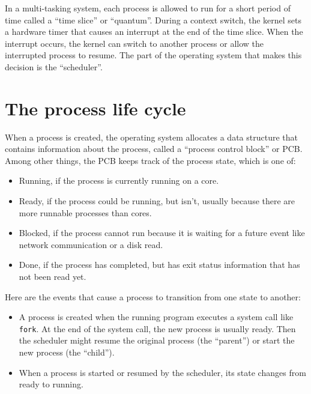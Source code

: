 \documentclass[12pt]{book}
\begin{document}
{In a multi-tasking system, each process is allowed to run for a short
period of time called a ``time slice'' or ``quantum''.  During
a context switch, the kernel sets a hardware timer that causes
an interrupt at the end of the time slice.  When the interrupt
occurs, the kernel can switch to another process or allow the
interrupted process to resume.  The part of the operating system
that makes this decision is the ``scheduler''.


\section{The process life cycle}

When a process is created, the operating system allocates a
data structure that contains information about the process, called
a ``process control block'' or PCB.  Among other things, the
PCB keeps track of the process state, which is one of:

\begin{itemize}

\item Running, if the process is currently running on a core.

\item Ready, if the process could be running, but isn't, usually because
there are more runnable processes than cores.

\item Blocked, if the process cannot run because it is waiting for
a future event like network communication or a disk read.

\item Done, if the process has completed, but has exit status
information that has not been read yet.

\end{itemize}

Here are the events that cause a process to transition from one state to another:

\begin{itemize}

\item A process is created when the running program executes a system
  call like {\tt fork}.  At the end of the system call, the new
  process is usually ready.  Then the scheduler might resume the
  original process (the ``parent'') or start the new process (the
  ``child'').

\item When a process is started or resumed by the scheduler, its state
  changes from ready to running.


\end{itemize}}
\end{document}
